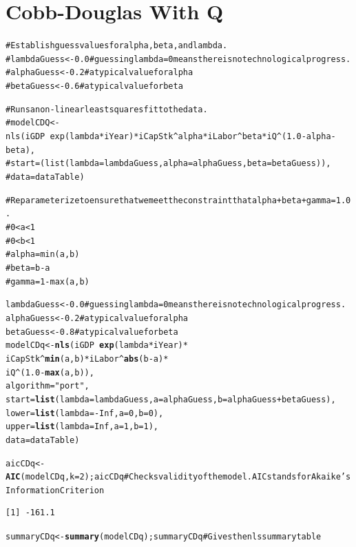\documentclass[10pt]{article}\usepackage{graphicx, color}
\makeatletter
\newcommand{\hlfunctioncall}[1]{\textcolor[rgb]{0.501960784313725,0,0.329411764705882}{\textbf{#1}}}%
\newcommand{\hlstring}[1]{\textcolor[rgb]{0.6,0.6,1}{#1}}%
\newcommand{\hlcomment}[1]{\textcolor[rgb]{0.180392156862745,0.6,0.341176470588235}{#1}}%
\newenvironment{kframe}{%
 \def\at@end@of@kframe{}%
 \ifinner\ifhmode%
  \def\at@end@of@kframe{\end{minipage}}%
  \begin{minipage}{\columnwidth}%
 \fi\fi%
 \def\FrameCommand##1{\hskip\@totalleftmargin \hskip-\fboxsep
 \colorbox{shadecolor}{##1}\hskip-\fboxsep
     \hskip-\linewidth \hskip-\@totalleftmargin \hskip\columnwidth}%
 \MakeFramed {\advance\hsize-\width
   \@totalleftmargin\z@ \linewidth\hsize
   \@setminipage}}%
 {\par\unskip\endMakeFramed%
 \at@end@of@kframe}
\newenvironment{knitrout}{}{} %
\makeatother
\begin{document}
\section{Cobb-Douglas With Q}

\begin{knitrout}
\color{fgcolor}\begin{kframe}
\begin{alltt}
\hlcomment{# Establish guess values for alpha, beta, and lambda.}
\hlcomment{# lambdaGuess <- 0.0 # guessing lambda = 0 means there is no technological progress.}
\hlcomment{# alphaGuess <- 0.2 # a typical value for alpha}
\hlcomment{# betaGuess <- 0.6 # a typical value for beta}

\hlcomment{# Runs a non-linear least squares fit to the data.}
\hlcomment{# modelCDQ <- nls(iGDP ~ exp(lambda*iYear) * iCapStk^alpha * iLabor^beta * iQ^(1.0 - alpha - beta), }
\hlcomment{#                 start=(list(lambda=lambdaGuess,alpha=alphaGuess,beta=betaGuess)),}
\hlcomment{#                 data=dataTable)}

\hlcomment{# Reparameterize to ensure that we meet the constraint that alpha + beta + gamma = 1.0.}
\hlcomment{# 0 < a < 1}
\hlcomment{# 0 < b < 1}
\hlcomment{# alpha = min(a, b)}
\hlcomment{# beta = b - a}
\hlcomment{# gamma = 1 - max(a, b)}

lambdaGuess <- 0.0 \hlcomment{# guessing lambda = 0 means there is no technological progress.}
alphaGuess <- 0.2 \hlcomment{# a typical value for alpha}
betaGuess <- 0.8 \hlcomment{# a typical value for beta}
modelCDq <- \hlfunctioncall{nls}(iGDP ~ \hlfunctioncall{exp}(lambda*iYear) * 
                            iCapStk^\hlfunctioncall{min}(a,b) * iLabor^\hlfunctioncall{abs}(b-a) * 
                            iQ^(1.0 - \hlfunctioncall{max}(a,b)), 
  algorithm = \hlstring{"port"},
  start = \hlfunctioncall{list}(lambda=lambdaGuess, a=alphaGuess, b=alphaGuess+betaGuess),
	lower = \hlfunctioncall{list}(lambda=-Inf, a=0, b=0),
	upper = \hlfunctioncall{list}(lambda=Inf, a=1, b=1),
  data = dataTable)

aicCDq <- \hlfunctioncall{AIC}(modelCDq, k=2); aicCDq \hlcomment{# Checks validity of the model. AIC stands for Akaike's Information Criterion}
\end{alltt}
\begin{verbatim}
[1] -161.1
\end{verbatim}
\begin{alltt}

summaryCDq <- \hlfunctioncall{summary}(modelCDq); summaryCDq \hlcomment{# Gives the nls summary table}
\end{alltt}
\begin{verbatim}


\end{verbatim}
\end{kframe}
\end{knitrout}
\end{document}
